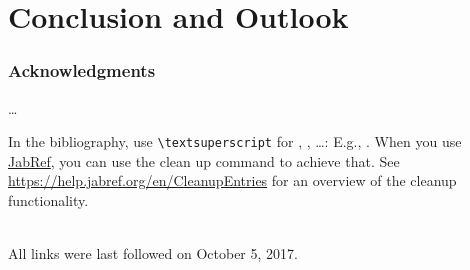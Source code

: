 \documentclass[english,runningheads,a4paper]{llncs}[2018/03/10]
\begin{document}
\section{Conclusion and Outlook}
\label{sec:outlook}
\lipsum[1-2]

\subsubsection*{Acknowledgments}
\ldots

In the bibliography, use \texttt{\textbackslash textsuperscript} for , , \ldots:
E.g., .
When you use \href{https://www.jabref.org}{JabRef}, you can use the clean up command to achieve that.
See \url{https://help.jabref.org/en/CleanupEntries} for an overview of the cleanup functionality.

\renewcommand{\bibsection}{\section*{References}} %

\begingroup
  \ifluatex
  \else
  \fi
  \small %
  
\endgroup

\ \\
%
All links were last followed on October 5, 2017.
\end{document}
